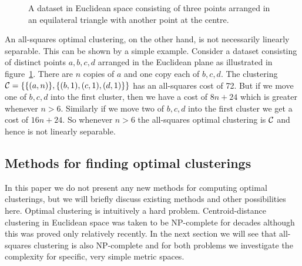 \begin{figure}
  \centering
  \caption{A dataset in Euclidean space consisting of three points arranged in
  an equilateral triangle with another point at the centre.}
  \label{fig:points-in-plane}
\end{figure}

An all-squares optimal clustering, on the other hand, is not necessarily
linearly separable.  This can be shown by a simple example.  Consider a
dataset consisting of distinct points $a,b,c,d$ arranged in the Euclidean
plane as illustrated in figure~\ref{fig:points-in-plane}.  There are $n$
copies of $a$ and one copy each of $b,c,d$.  The clustering $\mathcal{C} =
\{\{(a,n)\},\{(b,1),(c,1),(d,1)\}\}$ has an all-squares cost of 72.  But if we
move one of $b,c,d$ into the first cluster, then we have a cost of $8n+24$
which is greater whenever $n>6$.  Similarly if we move two of $b,c,d$ into the
first cluster we get a cost of $16n+24$.  So whenever $n>6$ the all-squares
optimal clustering is $\mathcal{C}$ and hence is not linearly separable.

\subsection{Methods for finding optimal clusterings}
\label{sec:meth-find-optim}

In this paper we do not present any new methods for computing optimal
clusterings, but we will briefly discuss existing methods and other
possibilities here.  Optimal clustering is intuitively a hard problem.
Centroid-distance clustering in Euclidean space was taken to be NP-complete
for decades although this was proved only relatively
recently\citep{aloise09exact}.  In the next section we will see that
all-squares clustering is also NP-complete and for both problems we
investigate the complexity for specific, very simple metric spaces.

